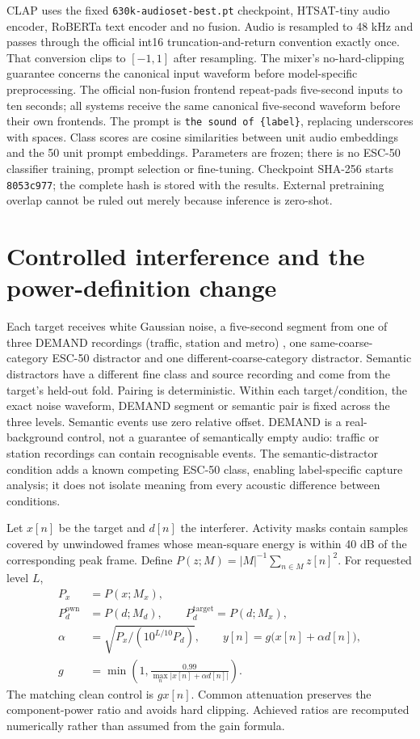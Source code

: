 \documentclass[a4paper,10pt]{article}
\begin{document}
CLAP uses the fixed \texttt{630k-audioset-best.pt} checkpoint, HTSAT-tiny audio
encoder, RoBERTa text encoder and no fusion. Audio is resampled to 48 kHz and
passes through the official int16 truncation-and-return convention exactly once.
That conversion clips to $[-1,1]$ after resampling. The mixer's no-hard-clipping
guarantee concerns the canonical input waveform before model-specific preprocessing.
The official non-fusion frontend repeat-pads five-second inputs to ten seconds;
all systems receive the same canonical five-second waveform before their own
frontends.
The prompt is \texttt{the sound of \{label\}}, replacing underscores with spaces.
Class scores are cosine similarities between unit audio embeddings and the 50
unit prompt embeddings. Parameters are frozen; there is no ESC-50 classifier
training, prompt selection or fine-tuning. Checkpoint SHA-256 starts
\texttt{8053c977}; the complete hash is stored with the results. External
pretraining overlap cannot be ruled out merely because inference is zero-shot.

\section{Controlled interference and the power-definition change}
Each target receives white Gaussian noise, a five-second segment from one of
three DEMAND recordings (traffic, station and metro) \cite{demand}, one same-coarse-category
ESC-50 distractor and one different-coarse-category distractor. Semantic
distractors have a different fine class and source recording and come from the
target's held-out fold. Pairing is deterministic. Within each target/condition,
the exact noise waveform, DEMAND segment or semantic pair is fixed across the
three levels. Semantic events use zero relative offset.
DEMAND is a real-background control, not a guarantee of semantically empty
audio: traffic or station recordings can contain recognisable events. The
semantic-distractor condition adds a known competing ESC-50 class, enabling
label-specific capture analysis; it does not isolate meaning from every acoustic
difference between conditions.

Let $x[n]$ be the target and $d[n]$ the interferer. Activity masks contain samples
covered by unwindowed frames whose mean-square energy is within 40 dB of the
corresponding peak frame. Define $P(z;M)=|M|^{-1}\sum_{n\in M}z[n]^2$.
For requested level $L$,
\begin{align}
P_x &=P(x;M_x),\\
P_d^{\mathrm{own}}&=P(d;M_d),\qquad
P_d^{\mathrm{target}}=P(d;M_x),\\
\alpha&=\sqrt{P_x/(10^{L/10}P_d)},\qquad
y[n]=g\bigl(x[n]+\alpha d[n]\bigr),\\
g&=\min\!\left(1,\frac{0.99}{\max_n|x[n]+\alpha d[n]|}\right).
\end{align}
The matching clean control is $gx[n]$. Common attenuation preserves the
component-power ratio and avoids hard clipping. Achieved ratios are recomputed
numerically rather than assumed from the gain formula.
\end{document}
